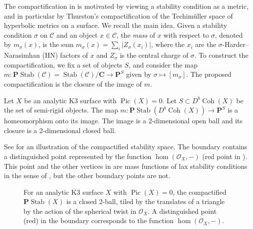 \documentclass{amsart}
\begin{document}
The compactification in \cite{bap.deo.lic:20} is motivated by viewing a stability condition as a metric, and in particular by Thurston's compactification of the Techim\"uller space of hyperbolic metrics on a surface.
We recall the main idea.
Given a stability condition \(\sigma\) on \(\mathcal{C}\) and an object \(x \in \mathcal{C}\), the \emph{mass} of \(x\) with respect to \(\sigma\), denoted by \(m_{\sigma}(x)\), is the sum
\( m_{\sigma}(x) = \sum_i |Z_{\sigma}(x_i)|\),
where the \(x_i\) are the \(\sigma\)-Harder--Narasimhan (HN) factors of \(x\) and \(Z_{\sigma}\) is the central charge of \(\sigma\).
To construct the compactification, we fix a set of objects \(S\), and consider the map
\(m \colon \mathbf{P} \operatorname{Stab}(\mathcal{C}) = \operatorname{Stab}(\mathcal{C}) / \mathbf{C} \to \mathbf{P}^S\)
given by \(\sigma \mapsto [m_{\sigma}]\).
The proposed compactification is the closure of the image of \(m\).
\begin{theorem}\label{thm:main}
  Let \(X\) be an analytic K3 surface with \(\operatorname{Pic}(X) = 0\).
  Let \(S \subset D^b\operatorname{Coh} (X)\) be the set of semi-rigid objects.
  The map \(m \colon \mathbf{P} \operatorname{Stab}(D^b \operatorname{Coh}(X)) \to \mathbf{P}^S\) is a homeomorphism onto its image.
  The image is a 2-dimensional open ball and its closure is a 2-dimensional closed ball.
\end{theorem}
See  for an illustration of the compactified stability space.
The boundary contains a distinguished point represented by the function \(\hom(\mathcal{O}_X,-)\) (red point in ).
This point and the other vertices in  are mass functions of lax stability conditions in the sense of \cite{bro.pau.plo.ea:22}, but the other boundary points are not.
\begin{figure}[ht]
  \centering
    \caption{For an analytic K3 surface \(X\) with \(\operatorname{Pic}(X)= 0\), the compactified \(\mathbf{P} \operatorname{Stab}(X)\) is a closed 2-ball, tiled by the translates of a triangle by the action of the spherical twist in \(\mathcal{O}_X\).  A distinguished point (red) in the boundary corresponds to the function \(\hom(\mathcal{O}_X, -)\).}
    \label{fig:disk}
  \end{figure}
\end{document}
